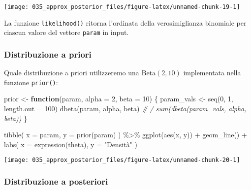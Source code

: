 \documentclass[
]{memoir}
\newenvironment{Shaded}{\begin{snugshade}}{\end{snugshade}}
\newcommand{\AttributeTok}[1]{\textcolor[rgb]{0.77,0.63,0.00}{#1}}
\newcommand{\CommentTok}[1]{\textcolor[rgb]{0.56,0.35,0.01}{\textit{#1}}}
\newcommand{\ControlFlowTok}[1]{\textcolor[rgb]{0.13,0.29,0.53}{\textbf{#1}}}
\newcommand{\DecValTok}[1]{\textcolor[rgb]{0.00,0.00,0.81}{#1}}
\newcommand{\FunctionTok}[1]{\textcolor[rgb]{0.00,0.00,0.00}{#1}}
\newcommand{\NormalTok}[1]{#1}
\newcommand{\OtherTok}[1]{\textcolor[rgb]{0.56,0.35,0.01}{#1}}
\newcommand{\SpecialCharTok}[1]{\textcolor[rgb]{0.00,0.00,0.00}{#1}}
\newcommand{\StringTok}[1]{\textcolor[rgb]{0.31,0.60,0.02}{#1}}
\begin{document}
\begin{center}\texttt{[image: 035\_approx\_posterior\_files/figure-latex/unnamed-chunk-19-1]} \end{center}

\noindent
La funzione \texttt{likelihood()} ritorna l'ordinata della verosimiglianza binomiale per ciascun valore del vettore \texttt{param} in input.

\hypertarget{distribuzione-a-priori}{%
\subsubsection{Distribuzione a priori}\label{distribuzione-a-priori}}

Quale distribuzione a priori utilizzeremo una \(\mbox{Beta}(2, 10)\) implementata nella funzione \texttt{prior()}:

\begin{Shaded}
\begin{Highlighting}[]
\NormalTok{prior }\OtherTok{\textless{}{-}} \ControlFlowTok{function}\NormalTok{(param, }\AttributeTok{alpha =} \DecValTok{2}\NormalTok{, }\AttributeTok{beta =} \DecValTok{10}\NormalTok{) \{}
\NormalTok{  param\_vals }\OtherTok{\textless{}{-}} \FunctionTok{seq}\NormalTok{(}\DecValTok{0}\NormalTok{, }\DecValTok{1}\NormalTok{, }\AttributeTok{length.out =} \DecValTok{100}\NormalTok{)}
  \FunctionTok{dbeta}\NormalTok{(param, alpha, beta) }\CommentTok{\# / sum(dbeta(param\_vals, alpha, beta))}
\NormalTok{\}}

\FunctionTok{tibble}\NormalTok{(}
  \AttributeTok{x =}\NormalTok{ param, }
  \AttributeTok{y =} \FunctionTok{prior}\NormalTok{(param)}
\NormalTok{) }\SpecialCharTok{\%\textgreater{}\%}
  \FunctionTok{ggplot}\NormalTok{(}\FunctionTok{aes}\NormalTok{(x, y)) }\SpecialCharTok{+}
  \FunctionTok{geom\_line}\NormalTok{() }\SpecialCharTok{+}
  \FunctionTok{labs}\NormalTok{(}
    \AttributeTok{x =} \FunctionTok{expression}\NormalTok{(theta),}
    \AttributeTok{y =} \StringTok{"Densità"}
\NormalTok{  )}
\end{Highlighting}
\end{Shaded}

\begin{center}\texttt{[image: 035\_approx\_posterior\_files/figure-latex/unnamed-chunk-20-1]} \end{center}

\hypertarget{distribuzione-a-posteriori}{%
\subsubsection{Distribuzione a posteriori}\label{distribuzione-a-posteriori}}
\end{document}
